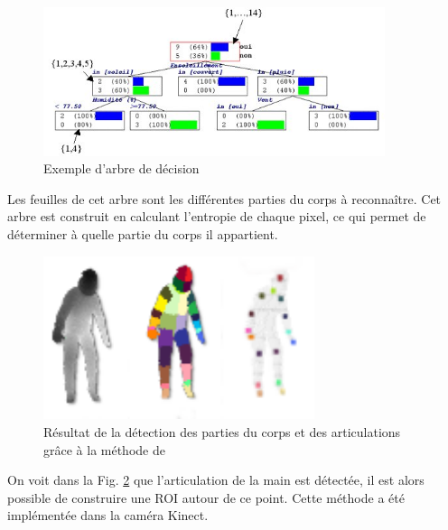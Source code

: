\begin{figure}[!h]
   \begin{center}
     \includegraphics[width=10cm]{images/Arbre_de_decision.jpg}
     \caption{Exemple d'arbre de décision}
     \label{fig:arbre}
   \end{center}
 \end{figure}

Les feuilles de cet arbre sont les différentes parties du corps à reconnaître. Cet arbre est construit en calculant
l'entropie de chaque pixel, ce qui permet de déterminer à quelle partie du corps il appartient.\\

\begin{figure}[!h]
 \begin{center}
  \includegraphics[width=300px]{images/bodyrecognition.png}
  \caption{Résultat de la détection des parties du corps et des articulations grâce à la méthode de \cite{export:145347}}
  \label{fig:bodyrecognition}
 \end{center}
\end{figure}

On voit dans la Fig. \ref{fig:bodyrecognition} que l'articulation de la main est détectée, il est alors possible de construire
une ROI autour de ce point. Cette méthode a été implémentée dans la caméra Kinect.\\

